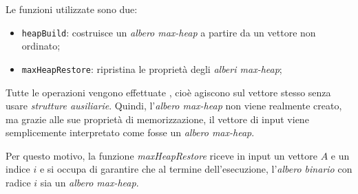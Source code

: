 Le funzioni utilizzate sono due:
\begin{itemize}
    \item \texttt{heapBuild}: costruisce un \emph{albero max-heap} a partire da
    un vettore non ordinato;
    \item \texttt{maxHeapRestore}: ripristina le proprietà degli \emph{alberi
    max-heap};
\end{itemize}
\begin{note}
    Tutte le operazioni vengono effettuate , cioè agiscono sul vettore
    stesso senza usare \emph{strutture ausiliarie}. Quindi, l'\emph{albero max-heap}
    non viene realmente creato, ma grazie alle sue proprietà di memorizzazione,
    il vettore di input viene semplicemente interpretato come fosse un \emph{albero
    max-heap}.
\end{note}
Per questo motivo, la funzione \emph{maxHeapRestore} riceve in input un vettore $A$
e un indice $i$ e si occupa di garantire che al termine dell'esecuzione,
l'\emph{albero binario} con radice $i$ sia un \emph{albero max-heap}.

